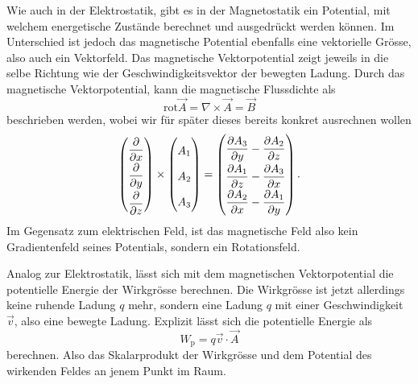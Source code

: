Wie auch in der Elektrostatik, gibt es in der Magnetostatik ein Potential, mit welchem energetische Zustände berechnet und ausgedrückt werden können. Im Unterschied ist jedoch das magnetische Potential ebenfalls eine vektorielle Grösse, also auch ein Vektorfeld. Das magnetische Vektorpotential zeigt jeweils in die selbe Richtung wie der Geschwindigkeitsvektor der bewegten Ladung.
Durch das magnetische Vektorpotential, kann die magnetische Flussdichte als 
\begin{equation}
	\text{rot}\vec{A}=\nabla \times \vec{A}
	=
	\vec{B}
	\label{maxwell:definitionVektorpot}
\end{equation}
beschrieben werden, wobei wir für später dieses bereits konkret ausrechnen wollen 
\begin{equation}
	\label{maxwell:nablaA}
	\renewcommand{\arraystretch}{1.9}
	\begin{pmatrix}
		\displaystyle
		\frac{\partial}{\partial x} \\
		\displaystyle
		\frac{\partial}{\partial y} \\
		\displaystyle
		\frac{\partial}{\partial z}
	\end{pmatrix}
	\times
	\begin{pmatrix}
		\displaystyle
		A_1 \\
		A_2 \\
		A_3 \\
	\end{pmatrix}
	=
	\begin{pmatrix}
		\displaystyle
		\frac{\partial A_3}{\partial y} -\frac{\partial A_2}{\partial z}\\
		\displaystyle
		\frac{\partial A_1}{\partial z} -\frac{\partial A_3}{\partial x}\\
		\displaystyle
		\frac{\partial A_2}{\partial x} -\frac{\partial A_1}{\partial y}
	\end{pmatrix}.
\end{equation}
Im Gegensatz zum elektrischen Feld, ist das magnetische Feld also kein Gradientenfeld seines Potentials, sondern ein Rotationsfeld.

Analog zur Elektrostatik, lässt sich mit dem magnetischen Vektorpotential die potentielle Energie der Wirkgrösse berechnen. Die Wirkgrösse ist jetzt allerdings keine ruhende Ladung $q$ mehr, sondern eine Ladung $q$ mit einer Geschwindigkeit $\vec{v}$, also eine bewegte Ladung. Explizit lässt sich die potentielle Energie als 
\[ W_{\text{p}} =  q\vec{v}\cdot\vec{A}\]
berechnen. Also das Skalarprodukt der Wirkgrösse und dem Potential des wirkenden Feldes an jenem Punkt im Raum.


